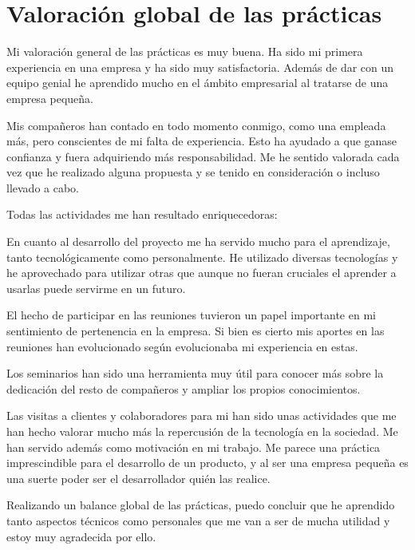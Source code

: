 \chapter{Valoración global de las prácticas \label{sec:conclusiones}}

\medskip

Mi valoración general de las prácticas es muy buena. Ha sido mi primera experiencia en una empresa y ha sido muy satisfactoria. Además de dar con un equipo genial he aprendido mucho en el ámbito empresarial al tratarse de una empresa pequeña.

\medskip

Mis compañeros han contado en todo momento conmigo, como una empleada más, pero conscientes de mi falta de experiencia. Esto ha ayudado a que ganase confianza y fuera adquiriendo más responsabilidad. Me he sentido valorada cada vez que he realizado alguna propuesta y se tenido en consideración o incluso llevado a cabo.

\medskip

Todas las actividades me han resultado enriquecedoras:
 
 \medskip
 
 En cuanto al desarrollo del proyecto me ha servido mucho para el aprendizaje, tanto tecnológicamente como personalmente. He utilizado diversas tecnologías y he aprovechado para utilizar otras que aunque no fueran cruciales el aprender a usarlas puede servirme en un futuro. 
 
 
 \medskip
 
 El hecho de participar en las reuniones tuvieron un papel importante en mi sentimiento de pertenencia en la empresa. Si bien es cierto mis aportes en las reuniones han evolucionado según evolucionaba mi experiencia en estas. 
 
 \medskip
 
 Los seminarios han sido una herramienta muy útil para conocer más sobre la dedicación del resto de compañeros y ampliar los propios conocimientos.
 
 \medskip
 
 Las visitas a clientes y colaboradores para mi han sido unas actividades que me han hecho valorar mucho más la repercusión de la tecnología en la sociedad. Me han servido además como motivación en mi trabajo. Me parece una práctica imprescindible para el desarrollo de un producto, y al ser una empresa pequeña es una suerte poder ser el desarrollador quién las realice.
 
 \medskip
 
Realizando un balance global de las prácticas, puedo concluir que he aprendido tanto aspectos técnicos como personales que me van a ser de mucha utilidad y estoy muy agradecida por ello.